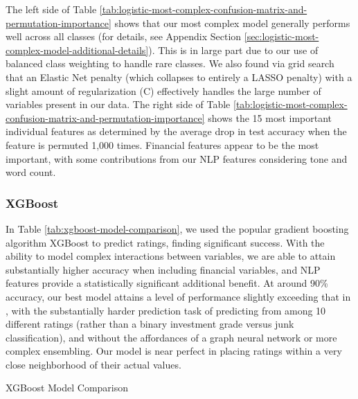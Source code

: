 \documentclass{article}[11pt]
\begin{document}
    The left side of Table \ref{tab:logistic-most-complex-confusion-matrix-and-permutation-importance} shows that our most complex model generally performs well across all classes (for details, see Appendix Section \ref{sec:logistic-most-complex-model-additional-details}). This is in large part due to our use of balanced class weighting to handle rare classes. We also found via grid search that an Elastic Net penalty (which collapses to entirely a LASSO penalty) with a slight amount of regularization (C) effectively handles the large number of variables present in our data. The right side of Table \ref{tab:logistic-most-complex-confusion-matrix-and-permutation-importance} shows the 15 most important individual features as determined by the average drop in test accuracy when the feature is permuted 1,000 times. Financial features appear to be the most important, with some contributions from our NLP features considering tone and word count.

    \subsubsection*{XGBoost}

    In Table \ref{tab:xgboost-model-comparison}, we used the popular gradient boosting algorithm XGBoost to predict ratings, finding significant success. With the ability to model complex interactions between variables, we are able to attain substantially higher accuracy when including financial variables, and NLP features provide a statistically significant additional benefit. At around 90\% accuracy, our best model attains a level of performance slightly exceeding that in \cite{das_credit_2023}, with the substantially harder prediction task of predicting from among 10 different ratings (rather than a binary investment grade versus junk classification), and without the affordances of a graph neural network or more complex ensembling. Our model is near perfect in placing ratings within a very close neighborhood of their actual values.

    \begin{table}[h!]
        \centering
        \caption{XGBoost Model Comparison}
        
        \label{tab:xgboost-model-comparison}
    \end{table}
\end{document}
